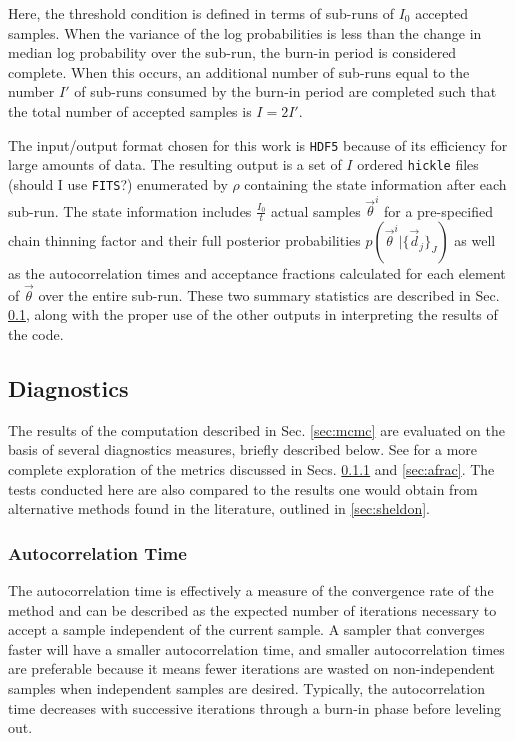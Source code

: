 \documentclass[preprint]{aastex}
\begin{document}
Here, the threshold condition is defined in terms of sub-runs of $I_{0}$ 
accepted samples.  When the variance of the log probabilities is less than the 
change in median log probability over the sub-run, the burn-in period is 
considered complete.  When this occurs, an additional number of sub-runs equal 
to the number $I'$ of sub-runs consumed by the burn-in period are completed 
such that the total number of accepted samples is $I=2I'$.  

The input/output format chosen for this work is \texttt{HDF5} because of its 
efficiency for large amounts of data.  The resulting output is a set of $I$ 
ordered \texttt{hickle} files (should I use \texttt{FITS}?) enumerated by 
$\rho$ containing the state information after each sub-run.  The state 
information includes $\frac{I_{0}}{t}$ actual samples $\vec{\theta}^{i}$ for a 
pre-specified chain thinning factor and their full posterior probabilities 
$p(\vec{\theta}^{i}|\{\vec{d}_{j}\}_{J})$ as well as the autocorrelation times 
and acceptance fractions calculated for each element of $\vec{\theta}$ over the 
entire sub-run.  These two summary statistics are described in Sec. 
\ref{sec:diag}, along with the proper use of the other outputs in interpreting 
the results of the code.

\clearpage
\subsection{Diagnostics}
\label{sec:diag}

The results of the computation described in Sec. \ref{sec:mcmc} are evaluated 
on the basis of several diagnostics measures, briefly described below.  See 
\citet{for12} for a more complete exploration of the metrics discussed in Secs. 
\ref{sec:acorr} and \ref{sec:afrac}.  The tests conducted here are also 
compared to the results one would obtain from alternative methods found in the 
literature, outlined in \ref{sec:sheldon}.

\clearpage
\subsubsection{Autocorrelation Time}
\label{sec:acorr}

The autocorrelation time is effectively a measure of the convergence rate of 
the method and can be described as the expected number of iterations necessary 
to accept a sample independent of the current sample.  A sampler that converges 
faster will have a smaller autocorrelation time, and smaller autocorrelation 
times are preferable because it means fewer iterations are wasted on 
non-independent samples when independent samples are desired.  Typically, the 
autocorrelation time decreases with successive iterations through a burn-in 
phase before leveling out.
\end{document}
